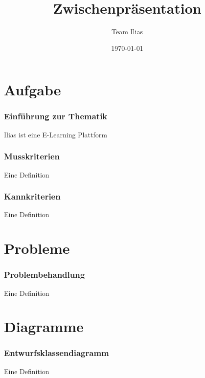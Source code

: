 \documentclass{beamer}
\title{Zwischenpräsentation}
\author{Team Ilias}
\date{\today}
\begin{document}
\maketitle
\frame{\tableofcontents[]}

 
\section{Aufgabe}
\begin{frame} %
  \frametitle{Einführung zur Thematik} %
  \begin{Überblick} %
    Ilias ist eine E-Learning Plattform
  \end{Überblick}
\end{frame}

\begin{frame} %
  \frametitle{Musskriterien} %
  \begin{Definition} %
    Eine Definition
  \end{Definition}
\end{frame}

\begin{frame} %
  \frametitle{Kannkriterien} %
  \begin{Definition} %
    Eine Definition
  \end{Definition}
\end{frame}

\section{Probleme}
\begin{frame} %
  \frametitle{Problembehandlung} %
  \begin{Definition} %
    Eine Definition
  \end{Definition}
\end{frame}

\section{Diagramme}
\begin{frame} %
  \frametitle{Entwurfsklassendiagramm} %
  \begin{Definition} %
    Eine Definition
  \end{Definition}
\end{frame}
\end{document}
